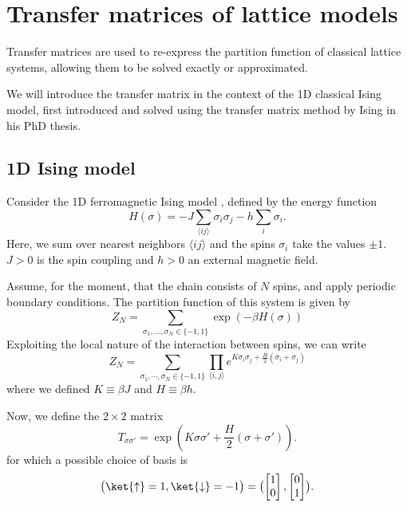 \section{Transfer matrices of lattice models}

Transfer matrices are used to re-express the partition function of classical
lattice systems, allowing them to be solved exactly or approximated.

We will introduce the transfer matrix in the context of the 1D classical
Ising model, first introduced and solved using the transfer matrix method by Ising
\cite{ising1925beitrag} in his PhD thesis.

\subsection{1D Ising model}
Consider the 1D ferromagnetic Ising model \cite{ising1925beitrag}, defined by the energy function
\begin{equation}\label{ising_energy_function}
  H(\sigma) = -J \sum_{\langle i j \rangle} \sigma_i \sigma_j - h \sum_{i} \sigma_i.
\end{equation}
Here, we sum over nearest neighbors $\langle i j \rangle$ and the spins
$\sigma_i$ take the values $\pm 1$. $J > 0$ is the spin coupling and $h > 0$ an external magnetic field.

Assume, for the moment, that the chain
consists of $N$ spins, and apply periodic boundary conditions.
The partition function of this system is given by
\begin{equation}
  Z_{N} = \sum_{\sigma_1, \dotsc, \sigma_N \in \{-1, 1\}} \exp (-\beta H(\sigma))
\end{equation}
Exploiting the local nature of the interaction between spins, we can write
\begin{equation}
  Z_{N} = \sum_{\sigma_1, \cdots, \sigma_N \in \{-1, 1\}} \prod_{\langle i, j \rangle} e^{K\sigma_i \sigma_j + \frac{H}{2}(\sigma_i + \sigma_j)}
\end{equation}
where we defined $K \equiv \beta J$ and $H \equiv \beta h$.

Now, we define the $2 \times 2$ matrix
\begin{equation}\label{eq:transfer_matrix_1d_ising}
  T_{\sigma \sigma'} = \exp(K \sigma \sigma' + \frac{H}{2}(\sigma + \sigma')).
\end{equation}
for which a possible choice of basis is
\begin{equation}\label{eq:basis_transfer_matrix_1d}
  \bigl( \ket{\uparrow} = 1, \ket{\downarrow} = -1 \bigr) =
  \bigl(
  \begin{bmatrix}
    1 \\
    0
  \end{bmatrix},
  \begin{bmatrix}
    0 \\
    1
  \end{bmatrix}
  \bigr).
\end{equation}

